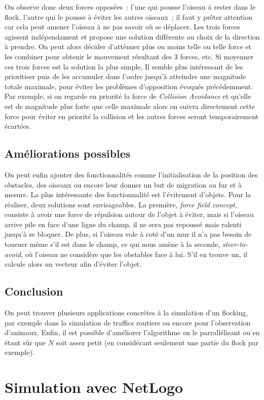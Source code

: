\documentclass{article}
\begin{document}
On observe donc deux forces opposées~: l'une qui pousse l'oiseau à rester dans le flock, l'autre qui le pousse à éviter les autres oiseaux~; il faut y prêter attention car cela peut amener l'oiseau à ne pas savoir où se déplacer.
Les trois forces agissent indépendament et propose une solution différente au choix de la direction à prendre. On peut alors décider d'atténuer plus ou moins telle ou telle force et les combiner pour obtenir le mouvement résultant des 3 forces, etc. Si moyenner ces trois forces est la solution la plus simple, Il semble plus intéressant de les prioritiser puis de les accumuler dans l'ordre jusqu'à atteindre une magnitude totale maximale, pour éviter les problèmes d'opposition évoqués précédemment. Par exemple, si on regarde en priorité la force de \emph{Collision Avoidance} et qu'elle est de magnitude plus forte que celle maximale alors on suivra directement cette force pour éviter en priorité la collision et les autres forces seront temporairement écartées.

\subsection{Améliorations possibles}
On peut enfin ajouter des fonctionnalités comme l'initialisation de la position des obstacles, des oiseaux ou encore leur donner un but de migration au fur et à mesure. La plus intéressante des fonctionnalité est l'évitement d'objets. Pour la réaliser, deux solutions sont envisageables. La première, \emph{force field concept}, consiste à avoir une force de répulsion autour de l'objet à éviter, mais si l'oiseau arrive pile en face d'une ligne du champ, il ne sera pas repoussé mais ralenti jusqu'à se bloquer. De plus, si l'oiseau vole à coté d'un mur il n'a pas besoin de tourner même s'il est dans le champ, ce qui nous amène à la seconde, \emph{steer-to-avoid}, où l'oiseau ne considère que les obstables face à lui. S'il en trouve un, il calcule alors un vecteur afin d'éviter l'objet.

\subsection{Conclusion}
On peut trouver plusieurs applications concrètes à la simulation d'un flocking, par exemple dans la simulation de traffics routiers ou encore pour l'observation d'animaux.
Enfin, il est possible d'améliorer l'algorithme en le parrallélisant ou en étant sûr que $N$ soit assez petit (en considérant seulement une partie du flock par exemple).

\section{Simulation avec NetLogo}
\end{document}
